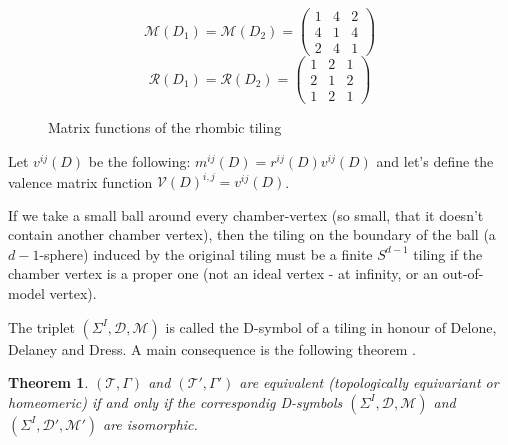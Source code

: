 \documentclass[12pt,a4paper]{article}
\numberwithin{equation}{section}
\theoremstyle{plain}%
\newtheorem{thm}{Theorem}[section]
\theoremstyle{definition}
\theoremstyle{remark}
\begin{document}
\begin{figure}
  \caption{\label{fig:rhombic_mx} Matrix functions of the rhombic tiling}
  \begin{equation*}
    \mathcal{M}(D_1)=\mathcal{M}(D_2)=
    \left(
    \begin{array}{cccc}
      1 & 4 & 2\\
      4 & 1 & 4\\
      2 & 4 & 1
    \end{array}
    \right)
  \end{equation*}
  \begin{equation*}
    \mathcal{R}(D_1)=\mathcal{R}(D_2)=
    \left(
    \begin{array}{cccc}
      1 & 2 & 1\\
      2 & 1 & 2\\
      1 & 2 & 1
    \end{array}
    \right)
  \end{equation*}
\end{figure}

Let $v^{ij}(D)$ be the following: $m^{ij}(D)=r^{ij}(D)v^{ij}(D)$ and
let's define the valence matrix function
$\mathcal{V}(D)^{i,j}=v^{ij}(D)$.


If we take a small ball around every chamber-vertex (so small, that it doesn't
contain another chamber vertex), then the tiling on the boundary of the ball (a
$d-1$-sphere)
induced by the original tiling must be a finite $S^{d-1}$ tiling \cite{D87} if the
chamber vertex is a proper one (not an ideal vertex - at infinity, or an
out-of-model vertex).

The triplet $(\Sigma^I,\mathcal{D},\mathcal{M})$ is called the D-symbol of a
tiling in honour of Delone, Delaney and Dress. A main consequence is the
following theorem \cite{D87}.
\begin{thm}
$(\mathcal{T},\Gamma)$ and
$(\mathcal{T}',\Gamma')$ are equivalent (topologically equivariant or homeomeric)
if and only if the correspondig D-symbols $(\Sigma^I,\mathcal{D},\mathcal{M})$ and
$(\Sigma^I,\mathcal{D}',\mathcal{M}')$ are isomorphic.
\end{thm}
\end{document}
